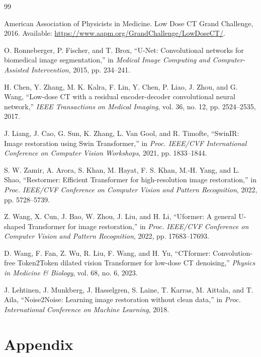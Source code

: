 \documentclass[12pt,a4paper]{report}
\begin{document}
\clearpage
{}
\begin{thebibliography}{99}
\singlespacing

American Association of Physicists in Medicine. Low Dose CT Grand Challenge, 2016. Available: \url{https://www.aapm.org/GrandChallenge/LowDoseCT/}.

O. Ronneberger, P. Fischer, and T. Brox, ``U-Net: Convolutional networks for biomedical image segmentation,'' in \textit{Medical Image Computing and Computer-Assisted Intervention}, 2015, pp. 234--241.

H. Chen, Y. Zhang, M. K. Kalra, F. Lin, Y. Chen, P. Liao, J. Zhou, and G. Wang, ``Low-dose CT with a residual encoder-decoder convolutional neural network,'' \textit{IEEE Transactions on Medical Imaging}, vol. 36, no. 12, pp. 2524--2535, 2017.

J. Liang, J. Cao, G. Sun, K. Zhang, L. Van Gool, and R. Timofte, ``SwinIR: Image restoration using Swin Transformer,'' in \textit{Proc. IEEE/CVF International Conference on Computer Vision Workshops}, 2021, pp. 1833--1844.

S. W. Zamir, A. Arora, S. Khan, M. Hayat, F. S. Khan, M.-H. Yang, and L. Shao, ``Restormer: Efficient Transformer for high-resolution image restoration,'' in \textit{Proc. IEEE/CVF Conference on Computer Vision and Pattern Recognition}, 2022, pp. 5728--5739.

Z. Wang, X. Cun, J. Bao, W. Zhou, J. Liu, and H. Li, ``Uformer: A general U-shaped Transformer for image restoration,'' in \textit{Proc. IEEE/CVF Conference on Computer Vision and Pattern Recognition}, 2022, pp. 17683--17693.

D. Wang, F. Fan, Z. Wu, R. Liu, F. Wang, and H. Yu, ``CTformer: Convolution-free Token2Token dilated vision Transformer for low-dose CT denoising,'' \textit{Physics in Medicine \& Biology}, vol. 68, no. 6, 2023.

J. Lehtinen, J. Munkberg, J. Hasselgren, S. Laine, T. Karras, M. Aittala, and T. Aila, ``Noise2Noise: Learning image restoration without clean data,'' in \textit{Proc. International Conference on Machine Learning}, 2018.

\end{thebibliography}
\doublespacing

\appendix
\chapter*{Appendix}
\end{document}
